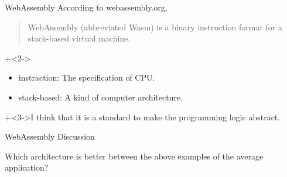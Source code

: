 \begin{frame}{WebAssembly}{}
    According to webassembly.org,
    \begin{quote}WebAssembly (abbreviated Wasm) is a binary instruction format for a stack-based virtual machine.\end{quote}
    \vspace{2ex}

    \onslide+<2->{
        \begin{itemize}
            \item   instraction:    The specification of CPU.
            \item   stack-based:    A kind of computer architecture.
        \end{itemize}
    }
    \vspace{2ex}

    \onslide+<3->{I think that it is a standard to make the programming logic abstract.}
\end{frame}


\begin{frame}{WebAssembly}{}
    Discussion
    \vspace{4ex}

    Which architecture is better between the above examples of the average application?
\end{frame}

